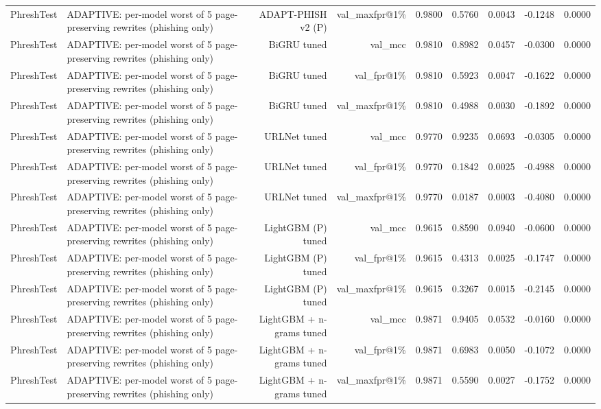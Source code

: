 \begin{table}[t]
\begin{tabular}{llrrrrrrr}
PhreshTest & ADAPTIVE: per-model worst of 5 page-preserving rewrites (phishing only) & ADAPT-PHISH v2 (P) & val\_maxfpr@1\% & 0.9800 & 0.5760 & 0.0043 & -0.1248 & 0.0000 \\
PhreshTest & ADAPTIVE: per-model worst of 5 page-preserving rewrites (phishing only) & BiGRU tuned & val\_mcc & 0.9810 & 0.8982 & 0.0457 & -0.0300 & 0.0000 \\
PhreshTest & ADAPTIVE: per-model worst of 5 page-preserving rewrites (phishing only) & BiGRU tuned & val\_fpr@1\% & 0.9810 & 0.5923 & 0.0047 & -0.1622 & 0.0000 \\
PhreshTest & ADAPTIVE: per-model worst of 5 page-preserving rewrites (phishing only) & BiGRU tuned & val\_maxfpr@1\% & 0.9810 & 0.4988 & 0.0030 & -0.1892 & 0.0000 \\
PhreshTest & ADAPTIVE: per-model worst of 5 page-preserving rewrites (phishing only) & URLNet tuned & val\_mcc & 0.9770 & 0.9235 & 0.0693 & -0.0305 & 0.0000 \\
PhreshTest & ADAPTIVE: per-model worst of 5 page-preserving rewrites (phishing only) & URLNet tuned & val\_fpr@1\% & 0.9770 & 0.1842 & 0.0025 & -0.4988 & 0.0000 \\
PhreshTest & ADAPTIVE: per-model worst of 5 page-preserving rewrites (phishing only) & URLNet tuned & val\_maxfpr@1\% & 0.9770 & 0.0187 & 0.0003 & -0.4080 & 0.0000 \\
PhreshTest & ADAPTIVE: per-model worst of 5 page-preserving rewrites (phishing only) & LightGBM (P) tuned & val\_mcc & 0.9615 & 0.8590 & 0.0940 & -0.0600 & 0.0000 \\
PhreshTest & ADAPTIVE: per-model worst of 5 page-preserving rewrites (phishing only) & LightGBM (P) tuned & val\_fpr@1\% & 0.9615 & 0.4313 & 0.0025 & -0.1747 & 0.0000 \\
PhreshTest & ADAPTIVE: per-model worst of 5 page-preserving rewrites (phishing only) & LightGBM (P) tuned & val\_maxfpr@1\% & 0.9615 & 0.3267 & 0.0015 & -0.2145 & 0.0000 \\
PhreshTest & ADAPTIVE: per-model worst of 5 page-preserving rewrites (phishing only) & LightGBM + n-grams tuned & val\_mcc & 0.9871 & 0.9405 & 0.0532 & -0.0160 & 0.0000 \\
PhreshTest & ADAPTIVE: per-model worst of 5 page-preserving rewrites (phishing only) & LightGBM + n-grams tuned & val\_fpr@1\% & 0.9871 & 0.6983 & 0.0050 & -0.1072 & 0.0000 \\
PhreshTest & ADAPTIVE: per-model worst of 5 page-preserving rewrites (phishing only) & LightGBM + n-grams tuned & val\_maxfpr@1\% & 0.9871 & 0.5590 & 0.0027 & -0.1752 & 0.0000 \\

\end{tabular}
\end{table}
